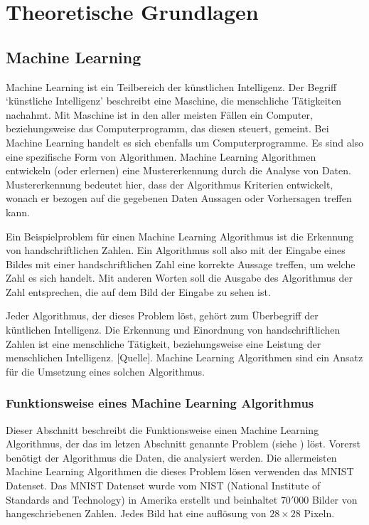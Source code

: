 \chapter{Theoretische Grundlagen}
\section{Machine Learning}
\label{chap:t_ml}
Machine Learning ist ein Teilbereich der künstlichen Intelligenz. Der Begriff
`künstliche Intelligenz' beschreibt eine Maschine, die menschliche Tätigkeiten
nachahmt. Mit Maschine ist in den aller meisten Fällen ein Computer,
beziehungsweise das Computerprogramm, das diesen steuert, gemeint. Bei Machine
Learning handelt es sich ebenfalls um Computerprogramme. Es sind also eine
spezifische Form von Algorithmen. Machine Learning Algorithmen entwickeln (oder
erlernen) eine Mustererkennung durch die Analyse von Daten. Mustererkennung
bedeutet hier, dass der Algorithmus Kriterien entwickelt, wonach er bezogen auf
die gegebenen Daten Aussagen oder Vorhersagen treffen kann.

Ein Beispielproblem für einen Machine Learning Algorithmus ist die Erkennung von
handschriftlichen Zahlen. Ein Algorithmus soll also mit der Eingabe eines Bildes
mit einer handschriftlichen Zahl eine korrekte Aussage treffen, um welche Zahl
es sich handelt. Mit anderen Worten soll die Ausgabe des Algorithmus der Zahl
entsprechen, die auf dem Bild der Eingabe zu sehen ist.

Jeder Algorithmus, der dieses Problem löst, gehört zum Überbegriff der
küntlichen Intelligenz. Die Erkennung und Einordnung von handschriftlichen
Zahlen ist eine menschliche Tätigkeit, beziehungsweise eine Leistung der
menschlichen Intelligenz. [Quelle]. Machine Learning Algorithmen sind ein Ansatz
für die Umsetzung eines solchen Algorithmus.

\subsection*{Funktionsweise eines Machine Learning Algorithmus}
\label{sub:funktionsweise}
Dieser Abschnitt beschreibt die Funktionsweise einen Machine Learning
Algorithmus, der das im letzen Abschnitt genannte Problem (siehe
) löst. Vorerst benötigt der Algorithmus die Daten, die
analysiert werden. Die allermeisten Machine Learning Algorithmen die dieses
Problem lösen verwenden das MNIST Datenset. Das MNIST Datenset wurde vom NIST
(National Institute of Standards and Technology) in Amerika erstellt und
beinhaltet $70'000$ Bilder von hangeschriebenen Zahlen. Jedes Bild hat eine
auflösung von $28\times28$ Pixeln.

